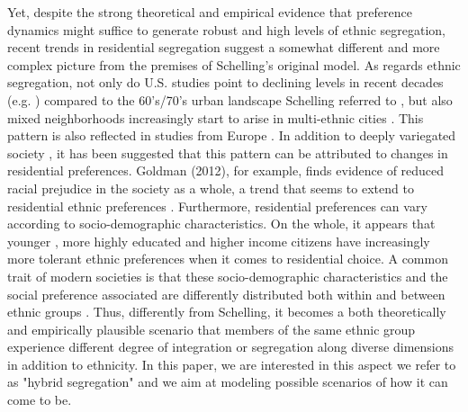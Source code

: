 \documentclass{article}
\begin{document}
Yet, despite the strong theoretical and empirical evidence that preference dynamics might suffice to generate robust and high levels of ethnic segregation, recent trends in residential segregation suggest a somewhat different and more complex picture from the premises of Schelling's original model. 
As regards ethnic segregation, not only do U.S. studies point to declining levels in recent decades (e.g. \textcite{glaeser2012end}) compared to the 60’s/70’s urban landscape \autocite{clark2015residential} Schelling referred to \autocite{schelling1969models}, but also mixed neighborhoods increasingly start to arise in multi-ethnic cities \autocite{clark2015residential, lee2012racial}. This pattern is also reflected in studies from Europe \autocite{blokland2010people}. In addition to deeply variegated society \autocite{lee2012racial}, it has been suggested that this pattern can be attributed to changes in residential preferences. Goldman (2012), for example, finds evidence of reduced racial prejudice in the society as a whole, a trend that seems to extend to residential ethnic preferences \autocite{xie2012modeling}. Furthermore, residential preferences can vary according to socio-demographic characteristics. On the whole, it appears that younger \autocite{clark2018can, clark2009changing}, more highly educated and higher income citizens have increasingly more tolerant ethnic preferences \autocite{clark2019neighborhood,crowder2012neighborhood,clark2009changing,xie2012modeling} when it comes to residential choice. A common trait of modern societies is that these socio-demographic characteristics and the social preference associated are differently distributed both within \autocite{clark2002residential,crul2017upcoming} and between ethnic groups \autocite{clark2009changing,crowder2012neighborhood}. Thus, differently from Schelling, it becomes a both theoretically and empirically plausible scenario that members of the same ethnic group experience different degree of integration or segregation along diverse dimensions in addition to ethnicity. In this paper, we are interested in this aspect we refer to as "hybrid segregation" and we aim at modeling possible scenarios of how it can come to be.
\end{document}
